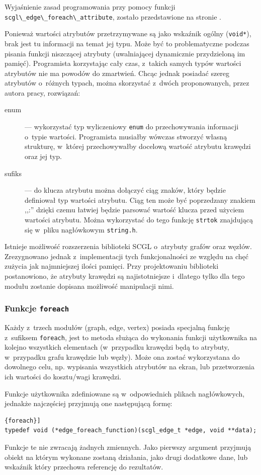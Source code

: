 \documentclass[a4paper,12pt,polish,oneside,openright]{thesis}
\newcommand\code[1]{\lstinline[style=line]{#1}}
\begin{document}
Wyjaśnienie zasad programowania przy pomocy funkcji \code{scgl\_edge\_foreach\_attribute}, zostało przedstawione na stronie \pageref{sec:foreach}.

Ponieważ wartości atrybutów przetrzymywane są jako wskaźnik ogólny (\code{void*}), brak jest tu informacji na temat jej typu.
Może być to problematyczne podczas pisania funkcji niszczącej atrybuty (uwalniającej dynamicznie przydzieloną im pamięć).
Programista korzystając cały czas, z~takich samych typów wartości atrybutów nie ma powodów do zmartwień.
Chcąc jednak posiadać szereg atrybutów o~różnych typach, można skorzystać z~dwóch proponowanych, przez autora pracy, rozwiązań:
\begin{description}
	\item[enum] --- wykorzystać typ wyliczeniowy \code{enum} do przechowywania informacji o~typie wartości.
	Programista musiałby wówczas stworzyć własną strukturę, w~której przechowywałby docelową wartość atrybutu krawędzi oraz jej typ.
	\item[sufiks] --- do klucza atrybutu można dołączyć ciąg znaków, który będzie definiował typ wartości atrybutu.
	Ciąg ten może być poprzedzany znakiem ,,:'' dzięki czemu łatwiej będzie parsować wartość klucza przed użyciem wartości atrybutu.
	Można wykorzystać do tego funkcję \code{strtok} znajdującą się w~pliku nagłówkowym \code{string.h}.
\end{description}

Istnieje możliwość rozszerzenia biblioteki SCGL o~atrybuty grafów oraz węzłów.
Zrezygnowano jednak z~implementacji tych funkcjonalności ze względu na chęć zużycia jak najmniejszej ilości pamięci.
Przy projektowaniu biblioteki postanowiono, że atrybuty krawędzi są najistotniejsze i~dlatego tylko dla tego modułu zostanie dopisana możliwość manipulacji nimi.

\subsubsection*{Funkcje \code{foreach}}
\label{sec:foreach}
Każdy z~trzech modułów (graph, edge, vertex) posiada specjalną funkcję z~sufiksem \code{foreach}, jest to metoda służąca do wykonania funkcji użytkownika na kolejno wszystkich elementach (w~przypadku krawędzi będą to atrybuty, w~przypadku grafu krawędzie lub węzły).
Może ona zostać wykorzystana do dowolnego celu, np. wypisania wszystkich atrybutów na ekran, lub przetworzenia ich wartości do kosztu/wagi krawędzi.

Funkcje użytkownika zdefiniowane są w~odpowiednich plikach nagłówkowych, jednakże najczęściej przyjmują one następującą formę:
\begin{lstlisting}[style=coden,caption=Przykładowa definicja funkcji użytkownika na potrzeby funkcji \code{foreach}]
typedef void (*edge_foreach_function)(scgl_edge_t *edge, void **data);
\end{lstlisting}
Funkcje te nie zwracają żadnych zmiennych.
Jako pierwszy argument przyjmują obiekt na którym wykonane zostaną działania, jako drugi dodatkowe dane, lub wskaźnik który przechowa referencję do rezultatów.
\end{document}
